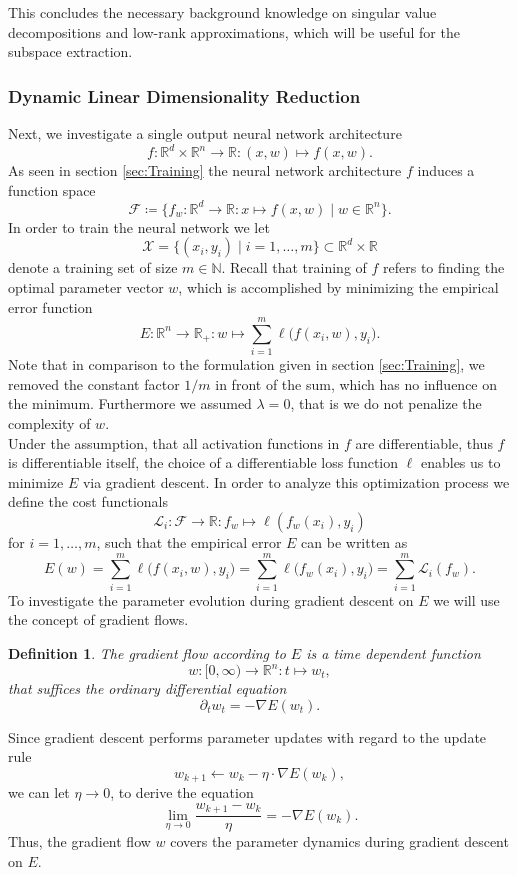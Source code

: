 \documentclass[11pt, a4paper]{article}
\newtheorem{definition}[theorem]{Definition}
\newcommand{\N}{\mathbb{N}}
\newcommand{\R}{\mathbb{R}}
\newcommand{\F}{\mathcal{F}}
\newcommand{\X}{\mathcal{X}}
\renewcommand{\L}{\mathcal{L}}
\begin{document}
This concludes the necessary background knowledge on singular value decompositions and low-rank approximations, which will be useful for the subspace extraction.

\subsubsection{Dynamic Linear Dimensionality Reduction}

Next, we investigate a single output neural network architecture 
\[ f: \R^d \times \R^n \to \R : (x,w) \mapsto f(x,w). \]
As seen in section \ref{sec:Training} the neural network architecture $f$ induces a function space
\[ \F \coloneq \Big \{ f_w : \R^d \to \R : x \mapsto f(x,w) \mid w \in \R^n \Big \}. \]
In order to train the neural network we let
\[ \X = \big \{ (x_i,y_i) \mid i=1, \dots, m \big \} \subset \R^d \times \R \] 
denote a training set of size $m \in \N$. Recall that training of $f$ refers to finding the optimal parameter vector $w$, which is accomplished by minimizing the empirical error function
\[ E : \R^n \to \R_+ : w \mapsto \sum_{i=1}^{m} \ell \big (f(x_i,w), y_i \big ). \]
Note that in comparison to the formulation given in section \ref{sec:Training}, we removed the constant factor $1/m$ in front of the sum, which has no influence on the minimum. Furthermore we assumed $\lambda = 0$, that is we do not penalize the complexity of $w$. \\

Under the assumption, that all activation functions in $f$ are differentiable, thus $f$ is differentiable itself, the choice of a differentiable loss function $\ell$ enables us to minimize $E$ via gradient descent. In order to analyze this optimization process we define the cost functionals
\[ \L_i: \F \to \R : f_w \mapsto \ell(f_w(x_i),y_i) \]
for $i=1, \dots,m$, such that the empirical error $E$ can be written as
\[ E(w) = \sum_{i=1}^{m} \ell \big (f(x_i,w), y_i \big ) = \sum_{i=1}^{m} \ell \big (f_w(x_i), y_i \big ) = \sum_{i=1}^{m} \L_i(f_w). \]
To investigate the parameter evolution during gradient descent on $E$ we will use the concept of gradient flows.

\begin{definition} \label{def:flow}
The gradient flow according to $E$ is a time dependent function
\[ w: [0, \infty) \to \R^n : t \mapsto w_t, \]
that suffices the ordinary differential equation
\[ \partial_t w_t = - \nabla E(w_t). \]
\end{definition}

Since gradient descent performs parameter updates with regard to the update rule
\[ w_{k+1} \leftarrow w_k - \eta \cdot \nabla E(w_k), \]
we can let $\eta \to 0$, to derive the equation
\[ \lim_{\eta \to 0} \frac{w_{k+1} - w_k}{\eta} = - \nabla E(w_k). \]
Thus, the gradient flow $w$ covers the parameter dynamics during gradient descent on $E$.
\end{document}
